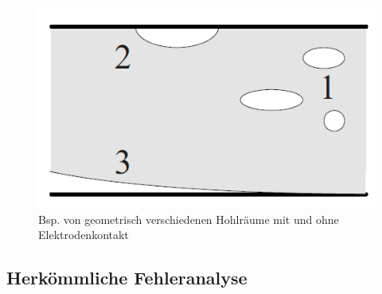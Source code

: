 \begin{refsection}
\begin{figure}
	\centering
	\includegraphics[width=0.5\linewidth]{papers/gis/Bilder/Hohlraum}
	\caption[]{Bsp. von geometrisch verschiedenen Hohlräume mit und ohne Elektrodenkontakt \cite{buch:Kuchler}}
	\label{fig:hohlraum}
\end{figure}
  
\subsection{Herkömmliche Fehleranalyse}


\end{refsection}
